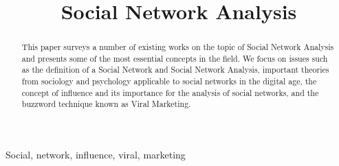 \documentclass[conference,letterpaper]{IEEEtran}
\begin{document}
\title{\huge Social Network Analysis}

\author{
}

\maketitle
\begin{abstract}
This paper surveys a number of existing works on the topic of Social Network Analysis and presents some of the most essential concepts in the field. We focus on issues such as the definition of a Social Network and Social Network Analysis, important theories from sociology and psychology applicable to social networks in the digital age, the concept of influence and its importance for the analysis of social networks, and the buzzword technique known as Viral Marketing.
\\
\end{abstract}

\begin{keywords}
Social, network, influence, viral, marketing
\end{keywords}
\end{document}
